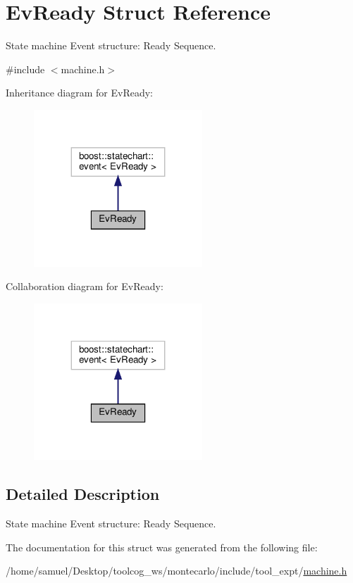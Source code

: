 \hypertarget{structEvReady}{}\section{Ev\+Ready Struct Reference}
\label{structEvReady}


State machine Event structure\+: Ready Sequence.  




{\ttfamily \#include $<$machine.\+h$>$}



Inheritance diagram for Ev\+Ready\+:
\nopagebreak
\begin{figure}[H]
\begin{center}
\leavevmode
\includegraphics[width=179pt]{structEvReady__inherit__graph}
\end{center}
\end{figure}


Collaboration diagram for Ev\+Ready\+:
\nopagebreak
\begin{figure}[H]
\begin{center}
\leavevmode
\includegraphics[width=179pt]{structEvReady__coll__graph}
\end{center}
\end{figure}


\subsection{Detailed Description}
State machine Event structure\+: Ready Sequence. 

The documentation for this struct was generated from the following file\+:\begin{DoxyCompactItemize}
\item 
/home/samuel/\+Desktop/toolcog\+\_\+ws/montecarlo/include/tool\+\_\+expt/\hyperlink{machine_8h}{machine.\+h}\end{DoxyCompactItemize}
